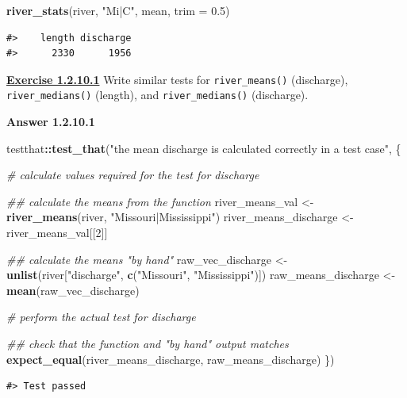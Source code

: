 \documentclass[
]{book}
\newenvironment{Shaded}{\begin{snugshade}}{\end{snugshade}}
\newcommand{\CommentTok}[1]{\textcolor[rgb]{0.56,0.35,0.01}{\textit{#1}}}
\newcommand{\DataTypeTok}[1]{\textcolor[rgb]{0.13,0.29,0.53}{#1}}
\newcommand{\DecValTok}[1]{\textcolor[rgb]{0.00,0.00,0.81}{#1}}
\newcommand{\FloatTok}[1]{\textcolor[rgb]{0.00,0.00,0.81}{#1}}
\newcommand{\KeywordTok}[1]{\textcolor[rgb]{0.13,0.29,0.53}{\textbf{#1}}}
\newcommand{\NormalTok}[1]{#1}
\newcommand{\OperatorTok}[1]{\textcolor[rgb]{0.81,0.36,0.00}{\textbf{#1}}}
\newcommand{\StringTok}[1]{\textcolor[rgb]{0.31,0.60,0.02}{#1}}
\begin{document}
\begin{Shaded}
\begin{Highlighting}[]
\KeywordTok{river_stats}\NormalTok{(river, }\StringTok{"Mi|C"}\NormalTok{, mean, }\DataTypeTok{trim =} \FloatTok{0.5}\NormalTok{)}
\end{Highlighting}
\end{Shaded}

\begin{verbatim}
#>    length discharge 
#>      2330      1956
\end{verbatim}

\textbf{\protect\hyperlink{ex-set4}{Exercise 1.2.10.1}} Write similar tests for \texttt{river\_means()} (discharge), \texttt{river\_medians()} (length), and \texttt{river\_medians()} (discharge).

\textbf{Answer 1.2.10.1}

\begin{Shaded}
\begin{Highlighting}[]
\NormalTok{testthat}\OperatorTok{::}\KeywordTok{test_that}\NormalTok{(}\StringTok{"the mean discharge is calculated correctly in a test case"}\NormalTok{, \{}
  
  \CommentTok{# calculate values required for the test for discharge}

  \CommentTok{## calculate the means from the function}
\NormalTok{  river_means_val <-}\StringTok{ }\KeywordTok{river_means}\NormalTok{(river, }\StringTok{"Missouri|Mississippi"}\NormalTok{)}
\NormalTok{  river_means_discharge <-}\StringTok{ }\NormalTok{river_means_val[[}\DecValTok{2}\NormalTok{]]}

  \CommentTok{## calculate the means "by hand"}
\NormalTok{  raw_vec_discharge <-}\StringTok{ }\KeywordTok{unlist}\NormalTok{(river[}\StringTok{"discharge"}\NormalTok{, }\KeywordTok{c}\NormalTok{(}\StringTok{"Missouri"}\NormalTok{, }\StringTok{"Mississippi"}\NormalTok{)])}
\NormalTok{  raw_means_discharge <-}\StringTok{ }\KeywordTok{mean}\NormalTok{(raw_vec_discharge)}
  
  \CommentTok{# perform the actual test for discharge}

  \CommentTok{## check that the function and "by hand" output matches}
  \KeywordTok{expect_equal}\NormalTok{(river_means_discharge, raw_means_discharge)}
\NormalTok{\})}
\end{Highlighting}
\end{Shaded}

\begin{verbatim}
#> Test passed
\end{verbatim}
\end{document}

